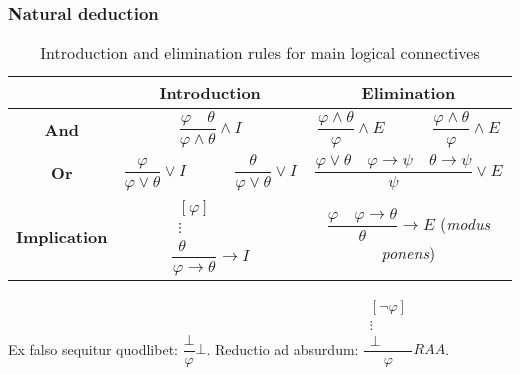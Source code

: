 \documentclass[]{article}
\begin{document}
\subsubsection{Natural deduction}

\begin{table}[h]
	\centering
	\caption{Introduction and elimination rules for main logical connectives}
	\begin{tabular}{ |c |c|c | } 
		\hline
		& \textbf{Introduction} & \textbf{Elimination} \\
		\hline
		\textbf{And} & $\dfrac{\varphi \hspace{1em} \theta}{\varphi \land \theta}\land I$ & $\dfrac{\varphi \land \theta}{\varphi}\land E \hspace{3em} \dfrac{\varphi \land \theta}{\varphi}\land E$ \\
		\hline
		\textbf{Or} & $\dfrac{\varphi}{\varphi \lor \theta} \lor I \hspace{3em} \dfrac{\theta}{\varphi \lor \theta} \lor I$ & $\dfrac{\varphi \lor \theta \hspace{1em} \varphi \rightarrow \psi \hspace{1em} \theta \rightarrow \psi}{\psi} \lor E$ \\
		\hline
		\textbf{Implication} & $\dfrac{\begin{array}{c} [\varphi] \\ \vdots \\ \theta \end{array}}{\varphi \rightarrow \theta} \rightarrow I$ & $\dfrac{\varphi \hspace{1em} \varphi \rightarrow \theta}{\theta} \rightarrow E$ (\textit{modus ponens}) \\
		\hline
	\end{tabular}
\end{table}

\noindent Ex falso sequitur quodlibet: $\dfrac{\bot}{\varphi}\bot$. Reductio ad absurdum: $\dfrac{\begin{array}{c} [\neg \varphi] \\ \vdots \\ \bot \end{array}}{\varphi} RAA$.

\end{document}
